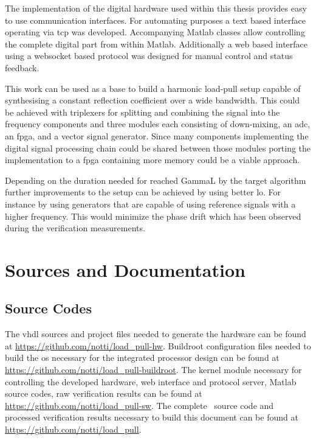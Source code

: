 \documentclass[12pt,a4paper,parskip=full,abstract=true,BCOR=12mm,twoside,open=right]{scrreprt}
\begin{document}
The implementation of the digital hardware used within this thesis provides
easy to use communication interfaces. For automating purposes a text based
interface operating via \gls{tcp} was developed. Accompanying Matlab classes
allow controlling the complete digital part from within Matlab. Additionally
a web based interface using a websocket based protocol was designed for
manual control and status feedback.

This work can be used as a base to build a harmonic load-pull setup capable
of synthesising a constant reflection coefficient over a wide bandwidth. This
could be achieved with triplexers for splitting and combining the signal into
the frequency components and three modules each consisting of down-mixing, an
\gls{adc}, an \gls{fpga}, and a vector signal generator. Since many components
implementing the digital signal processing chain could be shared between those
modules porting the implementation to a \gls{fpga} containing more memory could
be a viable approach.

Depending on the duration needed for reached \gls{GammaL} by the target
algorithm further improvements to the setup can be achieved by using better
\gls{lo}. For instance by using generators that are capable of using reference
signals with a higher frequency. This would minimize the phase drift which
has been observed during the verification measurements.


\appendix
\chapter{Sources and Documentation}
\section{Source Codes}
\label{sec:sources}

The \gls{vhdl} sources and project files needed to generate the hardware can be found at
\url{https://github.com/notti/load_pull-hw}. Buildroot configuration files needed to build
the \gls{os} necessary for the integrated processor design can be found at
\url{https://github.com/notti/load_pull-buildroot}. The kernel module necessary for controlling
the developed hardware, web interface and protocol server, Matlab source codes, raw verification results
can be found at \url{https://github.com/notti/load_pull-sw}. The complete \LuaLaTeX~source code
and processed verification results necessary to build this document can be found at
\url{https://github.com/notti/load_pull}.
\end{document}
